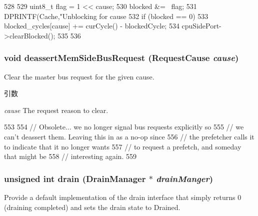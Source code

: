 \begin{DoxyCode}
528     {
529         uint8_t flag = 1 << cause;
530         blocked &= ~flag;
531         DPRINTF(Cache,"Unblocking for cause %
532         if (blocked == 0) {
533             blocked_cycles[cause] += curCycle() - blockedCycle;
534             cpuSidePort->clearBlocked();
535         }
536     }
\end{DoxyCode}
\hypertarget{classBaseCache_a7eb041ca3a51fe243525b95dea36f813}{
\subsubsection[{deassertMemSideBusRequest}]{\setlength{\rightskip}{0pt plus 5cm}void deassertMemSideBusRequest ({\bf RequestCause} {\em cause})}}
\label{classBaseCache_a7eb041ca3a51fe243525b95dea36f813}
Clear the master bus request for the given cause. 
\begin{DoxyParams}{引数}
\item[{\em cause}]The request reason to clear. \end{DoxyParams}



\begin{DoxyCode}
553     {
554         // Obsolete... we no longer signal bus requests explicitly so
555         // we can't deassert them.  Leaving this in as a no-op since
556         // the prefetcher calls it to indicate that it no longer wants
557         // to request a prefetch, and someday that might be
558         // interesting again.
559     }
\end{DoxyCode}
\hypertarget{classBaseCache_aa8a18d230dba7a674ac8a0b4f35bc36a}{
\subsubsection[{drain}]{\setlength{\rightskip}{0pt plus 5cm}unsigned int drain ({\bf DrainManager} $\ast$ {\em drainManger})}}
\label{classBaseCache_aa8a18d230dba7a674ac8a0b4f35bc36a}
Provide a default implementation of the drain interface that simply returns 0 (draining completed) and sets the drain state to Drained. 

